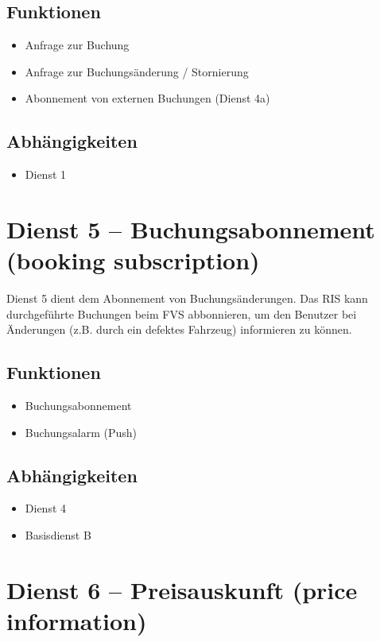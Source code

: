 \subsection*{Funktionen}
\begin{itemize}
\item Anfrage zur Buchung
\item Anfrage zur Buchungsänderung / Stornierung
\item Abonnement von externen Buchungen (Dienst 4a)
\end{itemize}

\subsection*{Abhängigkeiten}
\begin{itemize}
\item Dienst 1
\end{itemize}

\section{Dienst 5 -- Buchungsabonnement (booking subscription)}
\label{sec:Hierachiemodell:Dienst5}
Dienst 5 dient dem Abonnement von Buchungsänderungen. Das RIS kann durchgeführte Buchungen beim FVS abbonnieren, um den Benutzer bei Änderungen (z.B. durch ein defektes Fahrzeug) informieren zu können.

\subsection*{Funktionen}
\begin{itemize}
\item Buchungsabonnement
\item Buchungsalarm (Push)
\end{itemize}

\subsection*{Abhängigkeiten}
\begin{itemize}
\item Dienst 4
\item Basisdienst B
\end{itemize}

\section{Dienst 6 -- Preisauskunft (price information)}
\label{sec:Hierachiemodell:Dienst6}

